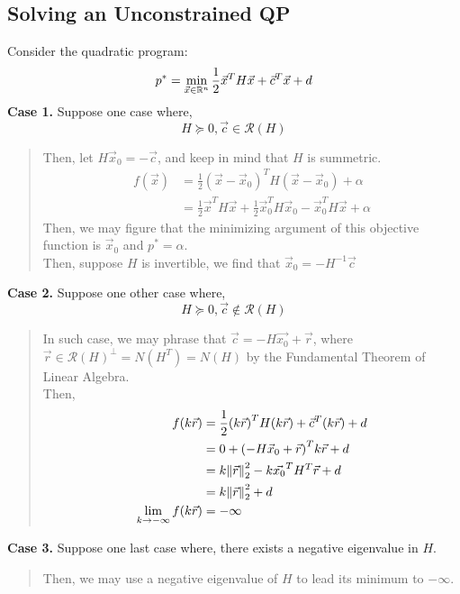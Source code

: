 \subsection{Solving an Unconstrained QP}
Consider the quadratic program:
\[
    p^* = \min_{\vec{x} \in \R^n} \frac{1}{2} \vec{x}^T H \vec{x} + \vec{c} ^T \vec{x} + d
\]
\textbf{Case 1.} Suppose one case where,
\[
    H \succcurlyeq 0, \vec{c} \in \mathcal{R}(H)
\]
\begin{quote}
    Then, let $H \vec{x}_0 = -\vec{c}$, and keep in mind that $H$ is summetric.
    \begin{align*}
        f(\vec{x})
        &= \frac{1}{2} {(\vec{x} - \vec{x}_0)}^T H (\vec{x} - \vec{x}_0) + \alpha \\
        &= \frac{1}{2} \vec{x}^T H \vec{x} + \frac{1}{2} \vec{x}_0^T H \vec{x}_0 - \vec{x}_0^T H \vec{x} + \alpha
    \end{align*}
    Then, we may figure that the minimizing argument of this objective function is $\vec{x}_0$ and $p^* = \alpha$. \\
    Then, suppose $H$ is invertible, we find that $\vec{x}_0 = - H^{-1} \vec{c}$
\end{quote}
\textbf{Case 2.} Suppose one other case where,
\[
    H \succcurlyeq 0, \vec{c} \not\in \mathcal{R}(H)
\]
\begin{quote}
    In such case, we may phrase that $\vec{c} = -H \vec{x_0} + \vec{r}$, where $\vec{r} \in {\mathcal{R}(H)}^{\perp} = N(H^T) = N(H)$ by the Fundamental Theorem of Linear Algebra. \\
    Then,
    \begin{align*}
        f(k \vec{r})
        &= \frac{1}{2} {(k \vec{r})}^T H (k \vec{r}) + \vec{c}^T (k \vec{r}) + d \\
        &= 0 + {(-H \vec{x}_0 + \vec{r})}^T k \vec{r} + d \\
        &= k \pnorm[2]{\vec{r}}{2} - k \vec{x_0}^T H^T \vec{r} + d \\
        &= k \pnorm[2]{\vec{r}}{2} + d \\
        \lim_{k \rightarrow -\infty} f(k \vec{r}) &= -\infty
    \end{align*}
\end{quote}
\textbf{Case 3.} Suppose one last case where, there exists a negative eigenvalue in $H$.
\begin{quote}
    Then, we may use a negative eigenvalue of $H$ to lead its minimum to $-\infty$.
\end{quote}

